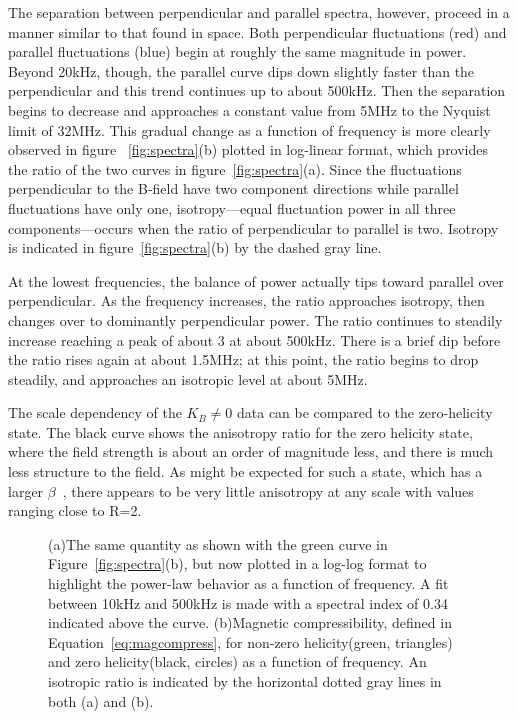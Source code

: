 \documentclass[preprint2]{aastex}
\begin{document}
The separation between perpendicular and parallel spectra, however, proceed in a manner similar to that found in space. Both perpendicular fluctuations (red) and parallel fluctuations (blue) begin at roughly the same magnitude in power. Beyond 20kHz, though, the parallel curve dips down slightly faster than the perpendicular and this trend continues up to about 500kHz. Then the separation begins to decrease and approaches a constant value from 5MHz to the Nyquist limit of 32MHz. This gradual change as a function of frequency is more clearly observed in figure ~\ref{fig:spectra}(b) plotted in log-linear format, which provides the ratio of the two curves in figure~\ref{fig:spectra}(a). Since the fluctuations perpendicular to the B-field have two component directions while parallel fluctuations have only one, isotropy---equal fluctuation power in all three components---occurs when the ratio of perpendicular to parallel is two. Isotropy is indicated in figure~\ref{fig:spectra}(b) by the dashed gray line.

At the lowest frequencies, the balance of power actually tips toward parallel over perpendicular. As the frequency increases, the ratio approaches isotropy, then changes over to dominantly perpendicular power. The ratio continues to steadily increase reaching a peak of about 3 at about 500kHz. There is a brief dip before the ratio rises again at about 1.5MHz; at this point, the ratio begins to drop steadily, and approaches an isotropic level at about 5MHz. 

The scale dependency of the $K_{B}\neq 0$ data can be compared to the zero-helicity state. The black curve shows the anisotropy ratio for the zero helicity state, where the field strength is about an order of magnitude less, and there is much less structure to the field. As might be expected for such a state, which has a larger $\beta$~\citep{smi06,sar14}, there appears to be very little anisotropy at any scale with values ranging close to R=2.

\begin{figure}
\caption{\label{fig:fitratio} (a)The same quantity as shown with the green curve in Figure~\ref{fig:spectra}(b), but now plotted in a log-log format to highlight the power-law behavior as a function of frequency. A fit between 10kHz and 500kHz is made with a spectral index of 0.34 indicated above the curve. (b)Magnetic compressibility, defined in Equation~\ref{eq:magcompress}, for non-zero helicity(green, triangles) and zero helicity(black, circles) as a function of frequency. An isotropic ratio is indicated by the horizontal dotted gray lines in both (a) and (b).}
\end{figure}
\end{document}
